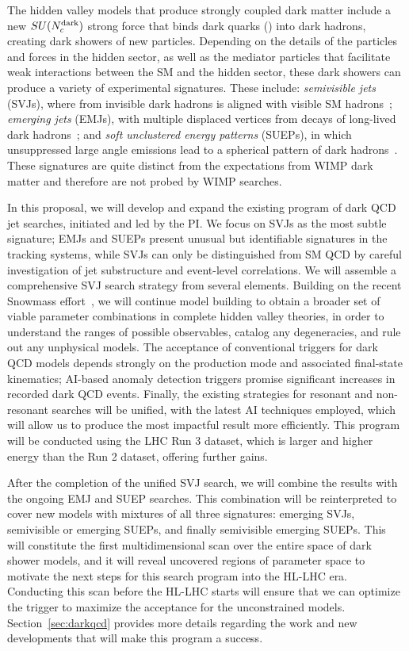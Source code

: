 The hidden valley models that produce strongly coupled dark matter include a new $SU(N_{c}^{\text{dark}})$ strong force that binds dark quarks (\Pqdark) into dark hadrons, creating dark showers of new particles.
Depending on the details of the particles and forces in the hidden sector,
as well as the mediator particles that facilitate weak interactions between the SM and the hidden sector,
these dark showers can produce a variety of experimental signatures.
These include: \emph{semivisible jets} (SVJs), where \met from invisible dark hadrons is aligned with visible SM hadrons~\cite{Cohen:2015toa};
\emph{emerging jets} (EMJs), with multiple displaced vertices from decays of long-lived dark hadrons~\cite{Schwaller:2015gea};
and \emph{soft unclustered energy patterns} (SUEPs), in which unsuppressed large angle emissions lead to a spherical pattern of dark hadrons~\cite{Knapen:2016hky}.
These signatures are quite distinct from the expectations from WIMP dark matter and therefore are not probed by WIMP searches.

In this proposal, we will develop and expand the existing program of dark QCD jet searches, initiated and led by the PI.
We focus on SVJs as the most subtle signature; EMJs and SUEPs present unusual but identifiable signatures in the tracking systems,
while SVJs can only be distinguished from SM QCD by careful investigation of jet substructure and event-level correlations.
We will assemble a comprehensive SVJ search strategy from several elements.
Building on the recent Snowmass effort~\cite{Albouy:2022cin}, we will continue model building to obtain a broader set of viable parameter combinations in complete hidden valley theories,
in order to understand the ranges of possible observables, catalog any degeneracies, and rule out any unphysical models.
The acceptance of conventional triggers for dark QCD models depends strongly on the production mode and associated final-state kinematics;
AI-based anomaly detection triggers promise significant increases in recorded dark QCD events.
Finally, the existing strategies for resonant and non-resonant searches will be unified, with the latest AI techniques employed,
which will allow us to produce the most impactful result more efficiently.
This program will be conducted using the LHC Run 3 dataset, which is larger and higher energy than the Run 2 dataset, offering further gains.

After the completion of the unified SVJ search, we will combine the results with the ongoing EMJ and SUEP searches.
This combination will be reinterpreted to cover new models with mixtures of all three signatures: emerging SVJs, semivisible or emerging SUEPs, and finally semivisible emerging SUEPs.
This will constitute the first multidimensional scan over the entire space of dark shower models,
and it will reveal uncovered regions of parameter space to motivate the next steps for this search program into the HL-LHC era.
Conducting this scan before the HL-LHC starts will ensure that we can optimize the trigger to maximize the acceptance for the unconstrained models.
Section~\ref{sec:darkqcd} provides more details regarding the work and new developments that will make this program a success.

